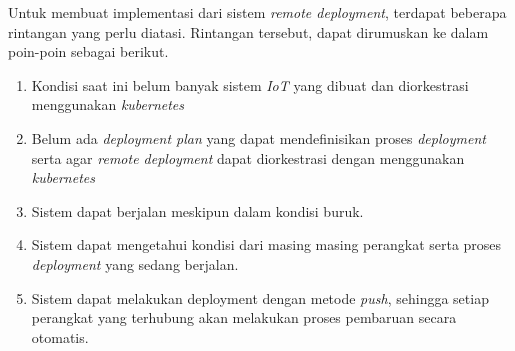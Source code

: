 Untuk membuat implementasi dari sistem \textit{remote deployment}, terdapat beberapa rintangan yang perlu diatasi. Rintangan tersebut, dapat dirumuskan ke dalam poin-poin sebagai berikut.

\begin{enumerate}
  \item Kondisi saat ini belum banyak sistem \textit{IoT} yang dibuat dan diorkestrasi menggunakan \textit{kubernetes}
  \item Belum ada \textit{deployment plan} yang dapat mendefinisikan proses \textit{deployment} serta agar \textit{remote deployment} dapat diorkestrasi  dengan menggunakan \textit{kubernetes}
  \item Sistem dapat berjalan meskipun dalam kondisi buruk.
  \item Sistem dapat mengetahui kondisi dari masing masing perangkat serta proses \textit{deployment} yang sedang berjalan.
  \item Sistem dapat melakukan deployment dengan metode \textit{push}, sehingga setiap perangkat yang terhubung akan melakukan proses pembaruan secara otomatis.
\end{enumerate}
